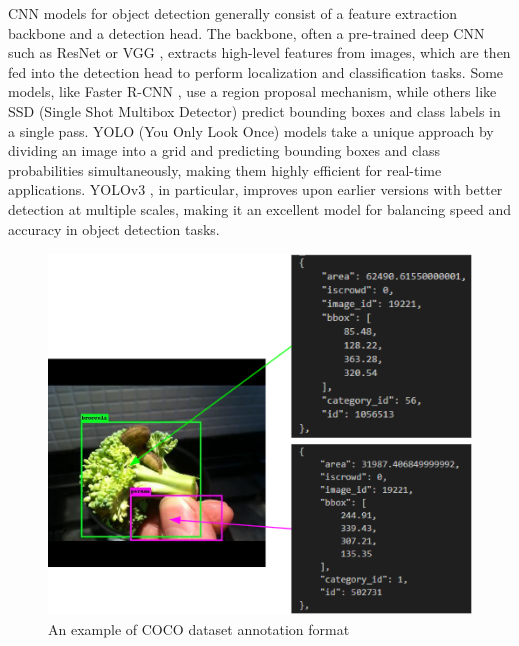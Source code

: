 \documentclass[journal,onecolumn,12pt]{IEEEtran}
\begin{document}
CNN models for object detection generally consist of a feature extraction backbone and a detection head. The backbone, often a pre-trained deep CNN such as ResNet \cite{he2015deepresiduallearningimage} or VGG \cite{simonyan2015deepconvolutionalnetworkslargescale}, extracts high-level features from images, which are then fed into the detection head to perform localization and classification tasks. Some models, like Faster R-CNN \cite{ren2016fasterrcnnrealtimeobject}, use a region proposal mechanism, while others like SSD (Single Shot Multibox Detector) \cite{Liu_2016} predict bounding boxes and class labels in a single pass. YOLO (You Only Look Once) models \cite{yolov1} take a unique approach by dividing an image into a grid and predicting bounding boxes and class probabilities simultaneously, making them highly efficient for real-time applications. YOLOv3 \cite{redmon2018yolov3incrementalimprovement}, in particular, improves upon earlier versions with better detection at multiple scales, making it an excellent model for balancing speed and accuracy in object detection tasks.

\begin{figure}
    \centering
    \captionsetup{justification=centering}
    \includegraphics[width=0.5\linewidth]{figures/label.PNG}
    \caption{An example of COCO dataset annotation format}
    \label{fig:coco}
\end{figure}
\end{document}
